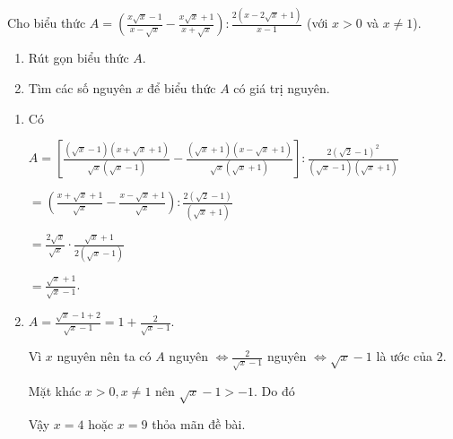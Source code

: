 \begin{ex}%
	Cho biểu thức $A = \left( \displaystyle \frac{x\sqrt{x}-1}{x- \sqrt{x}}- \frac{x \sqrt{x}+1}{x+\sqrt{x}}\right):\displaystyle \frac{2\left(x-2\sqrt{x}+1\right)}{x-1}$ (với $x >0$ và $x \ne 1$). 
	
	\begin{enumerate}[1)]
		\item Rút gọn biểu thức $A$.
		
		\item Tìm các số nguyên $x$ để biểu thức $A$ có giá trị nguyên.
	\end{enumerate}
\loigiai
	{
	\begin{enumerate}[1)]
		\item Có
		
		$A= \left[
		\displaystyle \frac{\left(\sqrt{x}-1\right) \left( x + \sqrt{x} +1\right)}{\sqrt{x}\left(\sqrt{x}-1\right)}- 
		\frac{\left(\sqrt{x}+1\right) \left( x - \sqrt{x} +1\right)}{\sqrt{x}\left(\sqrt{x}+1\right)}
		\right]:
		\displaystyle \frac{2 \left(\sqrt{2}-1\right)^2}{\left(\sqrt{x}-1\right) \left( \sqrt{x}+1\right)}$
		
		$= \left(
		\displaystyle \frac{ x + \sqrt{x} +1}{\sqrt{x}}- 
		\frac{ x - \sqrt{x} +1}{\sqrt{x}}
		\right):
		\displaystyle \frac{2 \left(\sqrt{2}-1\right)}{\left( \sqrt{x}+1\right)}$
		
		$\displaystyle =\frac{2 \sqrt{x}}{\sqrt{x}} \cdot \frac{\sqrt{x}+1}{2\left(\sqrt{x}-1\right)}$
		
		$\displaystyle =\frac{\sqrt{x}+1}{\sqrt{x}-1}$.
		
		\item $A = \displaystyle \frac{\sqrt{x}-1+2}{\sqrt{x}-1} =1 + \frac{2}{\sqrt{x}-1}$.
		
		Vì $x$ nguyên nên ta có $A$ nguyên $\Leftrightarrow \displaystyle \frac{2}{\sqrt{x}-1}$ nguyên $\Leftrightarrow \sqrt{x}-1$ là ước của $2$.
		
		Mặt khác $x>0, x \ne 1$ nên $\sqrt{x}-1 > -1$. Do đó 
		
		Vậy $x=4$ hoặc $x=9$ thỏa mãn đề bài.
	\end{enumerate}
	}
\end{ex}

